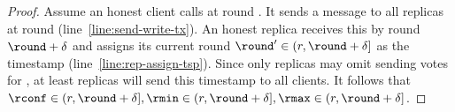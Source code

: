 \begin{theorem} \label{thm:pod-timely-crash}
\end{theorem}
\begin{proof}
	Assume an honest client \client calls \opwrite{\tx} at round \round.
	It sends a message \msgwrite{\tx} to all replicas at round \round (line~\ref{line:send-write-tx}).
	An honest replica receives this by round $\round + \delta$ and assigns its current round $\round' \in (r, \round + \delta]$ as the timestamp (line~\ref{line:rep-assign-tsp}).
	Since only \gamma replicas may omit sending votes for \tx, at least \alpha replicas will send this timestamp to all clients. It follows that $\rconf \in (r, \round + \delta], \rmin \in (r, \round + \delta], \rmax \in (r, \round + \delta]$.



\end{proof}
